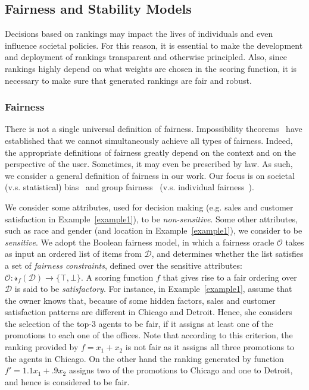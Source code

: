 \subsection{Fairness and Stability Models}\label{sec:defs} %
Decisions based on rankings may impact the lives of individuals and even influence societal policies. For this reason, it is essential to  make the development and deployment of rankings transparent and otherwise principled.
Also, since rankings highly depend on what weights are chosen in the scoring function, it is necessary to make sure that generated rankings are fair and robust.

\subsubsection{Fairness}
There is not a single universal definition of fairness.  
Impossibility theorems~\cite{friedler2016possibility} have established that we cannot simultaneously achieve all types of fairness.
Indeed, the appropriate definitions of fairness greatly depend on the context and on the perspective of the user. Sometimes, it may even be prescribed by law. 
As such, we consider a general definition of fairness in our work. Our focus is on societal (v.s. statistical) bias~\cite{narayanan2018translation} and group fairness~\cite{hardt2016equality} (v.s. individual fairness~\cite{dwork2012fairness}).

We consider some attributes, used for decision making (e.g. sales and customer satisfaction in Example~\ref{example1}), to be {\em non-sensitive}. Some other attributes, such as race and gender (and location in Example~\ref{example1}), we consider to be {\em sensitive}.
We adopt the Boolean fairness model, in which a fairness oracle $\mathcal{O}$ takes as input an ordered list of items from $\mathcal{D}$, and determines whether the list
satisfies a set of {\em fairness constraints}, defined over the sensitive attributes: $\mathcal{O}: \mathcal{r}_f(\mathcal{D}) \rightarrow \{\top, \bot\}$. A scoring function $f$ that gives rise to a fair ordering over  $\mathcal{D}$ is said to be {\em satisfactory}.
For instance, in Example~\ref{example1}, assume that the owner knows that, because of some hidden factors, sales and customer satisfaction patterns are different in Chicago and Detroit. Hence, she considers the selection of the top-3 agents to be fair, if it assigns at least one of the promotions to each one of the offices. Note that according to this criterion, the ranking provided by $f=x_1+x_2$ is not fair as it assigns all three promotions to the agents in Chicago.
On the other hand the ranking generated by function $f'=1.1x_1+.9x_2$ assigns two of the promotions to Chicago and one to Detroit, and hence is considered to be fair. 


